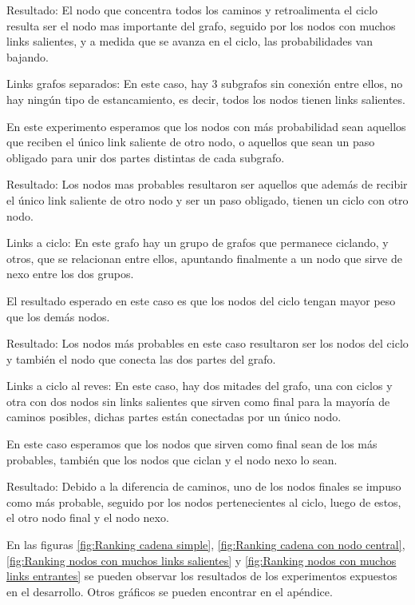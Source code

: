 Resultado: El nodo que concentra todos los caminos y retroalimenta el ciclo resulta ser el nodo mas importante del grafo, seguido por los nodos con muchos links salientes, y a medida que se avanza en el ciclo, las probabilidades van bajando.

Links grafos separados: En este caso, hay 3 subgrafos sin conexi\'on entre ellos, no hay ning\'un tipo de estancamiento, es decir, todos los nodos tienen links salientes.

En este experimento esperamos que los nodos con m\'as probabilidad sean aquellos que reciben el \'unico link saliente de otro nodo, o aquellos que sean un paso obligado para unir dos partes distintas de cada subgrafo.

Resultado: Los nodos mas probables resultaron ser aquellos que adem\'as de recibir el \'unico link saliente de otro nodo y ser un paso obligado, tienen un ciclo con otro nodo.

Links a ciclo: En este grafo hay un grupo de grafos que permanece ciclando, y otros, que se relacionan entre ellos, apuntando finalmente a un nodo que sirve de nexo entre los dos grupos.

El resultado esperado en este caso es que los nodos del ciclo tengan mayor peso que los dem\'as nodos.

Resultado: Los nodos m\'as probables en este caso resultaron ser los nodos del ciclo y tambi\'en el nodo que conecta las dos partes del grafo.

Links a ciclo al reves: En este caso, hay dos mitades del grafo, una con ciclos y otra con dos nodos sin links salientes que sirven como final para la mayor\'ia de caminos posibles, dichas partes est\'an conectadas por un \'unico nodo.

En este caso esperamos que los nodos que sirven como final sean de los m\'as probables, tambi\'en que los nodos que ciclan y el nodo nexo lo sean.

Resultado: Debido a la diferencia de caminos, uno de los nodos finales se impuso como m\'as probable, seguido por los nodos pertenecientes al ciclo, luego de estos, el otro nodo final y el nodo nexo.


En las figuras \ref{fig:Ranking cadena simple}, \ref{fig:Ranking cadena con nodo central}, \ref{fig:Ranking nodos con muchos links salientes} y \ref{fig:Ranking nodos con muchos links entrantes} se pueden observar los resultados de los experimentos expuestos en el desarrollo.
Otros gráficos se pueden encontrar en el apéndice.

